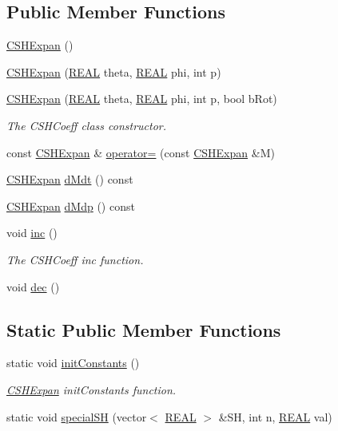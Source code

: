 \subsection*{Public Member Functions}
\begin{DoxyCompactItemize}
\item 
\hyperlink{classCSHExpan_a141e091316ee9113593dfa67ebd6671a}{C\-S\-H\-Expan} ()
\item 
\hyperlink{classCSHExpan_a9a5e37eb917fe30ccc1431c4ade75ad4}{C\-S\-H\-Expan} (\hyperlink{util_8h_a5821460e95a0800cf9f24c38915cbbde}{R\-E\-A\-L} theta, \hyperlink{util_8h_a5821460e95a0800cf9f24c38915cbbde}{R\-E\-A\-L} phi, int p)
\item 
\hyperlink{classCSHExpan_a0d136bdf88d91c6803e01fb2647a985d}{C\-S\-H\-Expan} (\hyperlink{util_8h_a5821460e95a0800cf9f24c38915cbbde}{R\-E\-A\-L} theta, \hyperlink{util_8h_a5821460e95a0800cf9f24c38915cbbde}{R\-E\-A\-L} phi, int p, bool b\-Rot)
\begin{DoxyCompactList}\small\item\em The C\-S\-H\-Coeff class constructor. \end{DoxyCompactList}\item 
const \hyperlink{classCSHExpan}{C\-S\-H\-Expan} \& \hyperlink{classCSHExpan_a8f0538b8cc6aace440bac8e7a90d8ed2}{operator=} (const \hyperlink{classCSHExpan}{C\-S\-H\-Expan} \&M)
\item 
\hyperlink{classCSHExpan}{C\-S\-H\-Expan} \hyperlink{classCSHExpan_af82377d4cfa223c33e9c2ba13f66ff55}{d\-Mdt} () const 
\item 
\hyperlink{classCSHExpan}{C\-S\-H\-Expan} \hyperlink{classCSHExpan_a3fa07d47acb2bd13df277011d2a748b0}{d\-Mdp} () const 
\item 
void \hyperlink{classCSHExpan_abc73ef3972a3fe3ad67209b6bcd0afc5}{inc} ()
\begin{DoxyCompactList}\small\item\em The C\-S\-H\-Coeff inc function. \end{DoxyCompactList}\item 
void \hyperlink{classCSHExpan_acc1ac9eff8f656057b6490be14de09d3}{dec} ()
\end{DoxyCompactItemize}
\subsection*{Static Public Member Functions}
\begin{DoxyCompactItemize}
\item 
static void \hyperlink{classCSHExpan_a0bc80f8710a4da0982b650089bcb94db}{init\-Constants} ()
\begin{DoxyCompactList}\small\item\em \hyperlink{classCSHExpan}{C\-S\-H\-Expan} init\-Constants function. \end{DoxyCompactList}\item 
static void \hyperlink{classCSHExpan_abf3a3735263858213f32f702ca8d8ea8}{special\-S\-H} (vector$<$ \hyperlink{util_8h_a5821460e95a0800cf9f24c38915cbbde}{R\-E\-A\-L} $>$ \&S\-H, int n, \hyperlink{util_8h_a5821460e95a0800cf9f24c38915cbbde}{R\-E\-A\-L} val)
\end{DoxyCompactItemize}
